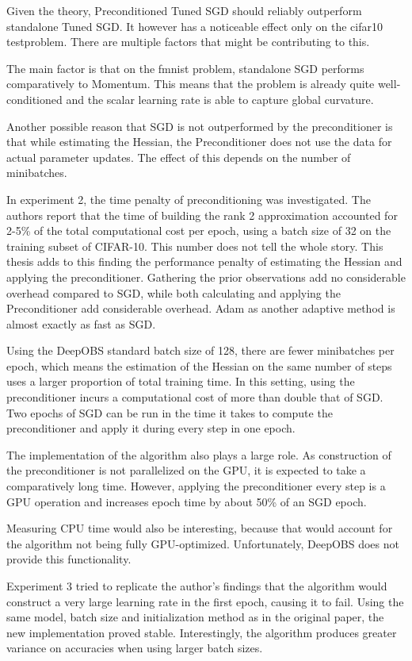 \documentclass[twoside,12pt,a4paper]{report}
\begin{document}
Given the theory, Preconditioned Tuned SGD should reliably outperform standalone Tuned SGD. It however has a noticeable effect only on the cifar10 testproblem. There are multiple factors that might be contributing to this.

The main factor is that on the fmnist problem, standalone SGD performs comparatively to Momentum. This means that the problem is already quite well-conditioned and the scalar learning rate is able to capture global curvature.

Another possible reason that SGD is not outperformed by the preconditioner is that while estimating the Hessian, the Preconditioner does not use the data for actual parameter updates. The effect of this depends on the number of minibatches.


In experiment 2, the time penalty of preconditioning was investigated. The authors report that the time of building the rank 2 approximation accounted for 2-5\% of the total computational cost per epoch, using a batch size of 32 on the training subset of CIFAR-10. This number does not tell the whole story. This thesis adds to this finding the performance penalty of estimating the Hessian and applying the preconditioner. Gathering the prior observations add no considerable overhead compared to SGD, while both calculating and applying the Preconditioner add considerable overhead. Adam as another adaptive method is almost exactly as fast as SGD.

Using the DeepOBS standard batch size of 128, there are fewer minibatches per epoch, which means the estimation of the Hessian on the same number of steps uses a larger proportion of total training time. In this setting, using the preconditioner incurs a computational cost of more than double that of SGD. Two epochs of SGD can be run in the time it takes to compute the preconditioner and apply it during every step in one epoch.

The implementation of the algorithm also plays a large role. As construction of the preconditioner is not parallelized on the GPU, it is expected to take a comparatively long time. However, applying the preconditioner every step is a GPU operation and increases epoch time by about 50\% of an SGD epoch.

Measuring CPU time would also be interesting, because that would account for the algorithm not being fully GPU-optimized. Unfortunately, DeepOBS does not provide this functionality.

Experiment 3 tried to replicate the author's findings that the algorithm would construct a very large learning rate in the first epoch, causing it to fail. Using the same model, batch size and initialization method as in the original paper, the new implementation proved stable.
Interestingly, the algorithm produces greater variance on accuracies when using larger batch sizes.
\end{document}
